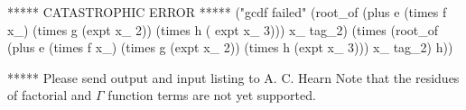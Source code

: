 ***** CATASTROPHIC ERROR ***** 
("gcdf failed" (root_of (plus e (times f x_) (times g (expt x_ 2)) (times h (
expt x_ 3))) x_ tag_2) (times (root_of (plus e (times f x_) (times g (expt 
x_ 2)) (times h (expt x_ 3))) x_ tag_2) h))

  

***** Please send output and input listing to A. C. Hearn 
\fi
Note that the residues of factorial and $\Gamma$ function terms are
not yet supported.




